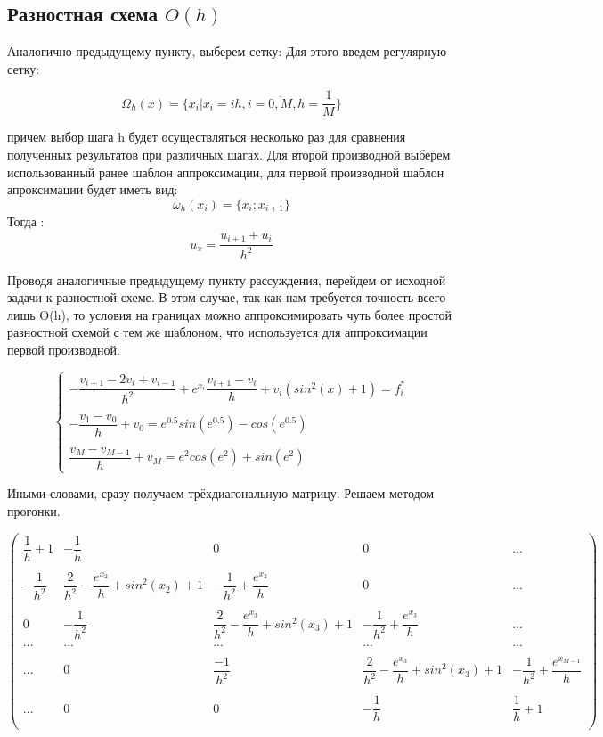 \documentclass[12pt]{article}
\begin{document}
\subsection{Разностная схема $O(h)$}

Аналогично предыдущему пункту, выберем сетку:
Для этого введем регулярную сетку:

$$
\Omega_h(x) = \{x_i | x_i = ih, i = \overline{0, M}, h = \dfrac{1}{M}\}
$$

причем выбор шага h будет осуществляться несколько раз для сравнения полученных результатов при различных шагах.
Для второй производной выберем использованный ранее шаблон аппроксимации, для первой производной шаблон апроксимации будет иметь вид:
$$
\omega_h(x_i) = \{ x_{i}; x_{i + 1}\}
$$
Тогда :
$$
u_x = \dfrac{u_{i + 1} + u_{i}}{h^2}
$$

Проводя аналогичные предыдущему пункту рассуждения, перейдем от исходной задачи к разностной схеме. В этом случае, так как нам требуется точность всего лишь O(h), то условия на границах можно аппроксимировать чуть более простой разностной схемой с тем же шаблоном, что используется для аппроксимации первой производной.

$$
\begin{cases}
- \dfrac{v_{i+1} - 2v_i + v_{i - 1}}{h^2} + e^{x_i}\dfrac{v_{i+1} - v_i}{h} + v_i(sin^2(x) + 1) = f_i^* \\
\\
- \dfrac{v_1 - v_0}{h} + v_0 = e^{0.5}sin(e^{0.5}) - cos(e^{0.5}) \\
\\
\dfrac{v_M - v_{M-1}}{h} + v_M = e^2cos(e^2) + sin(e^2)
\end{cases}
$$


Иными словами, сразу получаем трёхдиагональную матрицу. Решаем методом прогонки.

$$
\begin{pmatrix}
	\dfrac{1}{h} + 1& -\dfrac{1}{h} &  0 & 0 & ... \\
	\\
	-\dfrac{1}{h^2}  & \dfrac{2}{h^2} - \dfrac{e^{x_2}}{h} + sin^2(x_2) + 1 & -\dfrac{1}{h^2} + \dfrac{e^{x_2}}{h} & 0 & ... \\
	\\
	0 & -\dfrac{1}{h^2} & \dfrac{2}{h^2} - \dfrac{e^{x_3}}{h} + sin^2(x_3) + 1 &
	 -\dfrac{1}{h^2} + \dfrac{e^{x_3}}{h} & ... \\
	... & ... & ... & ... & ... \\
	\\
	... & 0 & \dfrac{-1}{h^2} & \dfrac{2}{h^2} - \dfrac{e^{x_3}}{h} + sin^2(x_3) + 1 &
	 -\dfrac{1}{h^2} + \dfrac{e^{x_{M-1}}}{h} \\
	\\
	... & 0 & 0 & -\dfrac{1}{h} & \dfrac{1}{h} + 1\\
\end{pmatrix}
$$
\newpage
\end{document}
